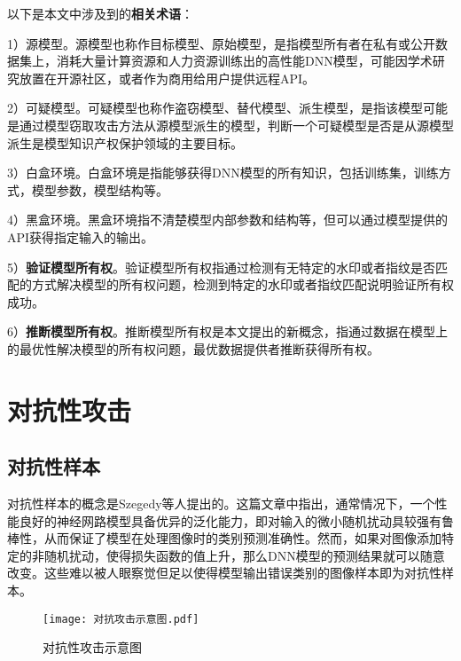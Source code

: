 以下是本文中涉及到的\textbf{相关术语}：

1）源模型。源模型也称作目标模型、原始模型，是指模型所有者在私有或公开数据集上，消耗大量计算资源和人力资源训练出的高性能DNN模型，可能因学术研究放置在开源社区，或者作为商用给用户提供远程API。

2）可疑模型。可疑模型也称作盗窃模型、替代模型、派生模型，是指该模型可能是通过模型窃取攻击方法从源模型派生的模型，判断一个可疑模型是否是从源模型派生是模型知识产权保护领域的主要目标。

3）白盒环境。白盒环境是指能够获得DNN模型的所有知识，包括训练集，训练方式，模型参数，模型结构等。

4）黑盒环境。黑盒环境指不清楚模型内部参数和结构等，但可以通过模型提供的API获得指定输入的输出。

5）\textbf{验证模型所有权}。验证模型所有权指通过检测有无特定的水印或者指纹是否匹配的方式解决模型的所有权问题，检测到特定的水印或者指纹匹配说明验证所有权成功。

6）\textbf{推断模型所有权}。推断模型所有权是本文提出的新概念，指通过数据在模型上的最优性解决模型的所有权问题，最优数据提供者推断获得所有权。




\section{对抗性攻击}

\subsection{对抗性样本}
 
对抗性样本的概念是Szegedy等人\cite{szegedy2013intriguing}提出的。这篇文章中指出，通常情况下，一个性能良好的神经网路模型具备优异的泛化能力，即对输入的微小随机扰动具较强有鲁棒性，从而保证了模型在处理图像时的类别预测准确性。然而，如果对图像添加特定的非随机扰动，使得损失函数的值上升，那么DNN模型的预测结果就可以随意改变。这些难以被人眼察觉但足以使得模型输出错误类别的图像样本即为对抗性样本。

\begin{figure}[htbp]%
	\centering
	\setlength{\abovecaptionskip}{3mm} %
	\setlength{\belowcaptionskip}{-3mm} %
	\texttt{[image: 对抗攻击示意图.pdf]}
	\caption{对抗性攻击示意图}
	\label{对抗性攻击示意图}
	\end {figure}

